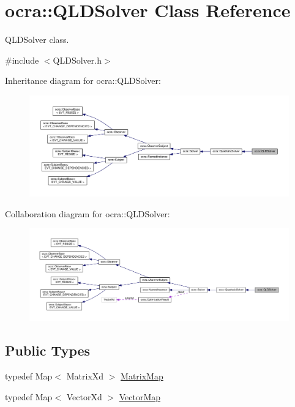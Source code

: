 \hypertarget{classocra_1_1QLDSolver}{}\section{ocra\+:\+:Q\+L\+D\+Solver Class Reference}
\label{classocra_1_1QLDSolver}


Q\+L\+D\+Solver class.  




{\ttfamily \#include $<$Q\+L\+D\+Solver.\+h$>$}



Inheritance diagram for ocra\+:\+:Q\+L\+D\+Solver\+:
\nopagebreak
\begin{figure}[H]
\begin{center}
\leavevmode
\includegraphics[width=350pt]{d8/dea/classocra_1_1QLDSolver__inherit__graph}
\end{center}
\end{figure}


Collaboration diagram for ocra\+:\+:Q\+L\+D\+Solver\+:
\nopagebreak
\begin{figure}[H]
\begin{center}
\leavevmode
\includegraphics[width=350pt]{dd/d5f/classocra_1_1QLDSolver__coll__graph}
\end{center}
\end{figure}
\subsection*{Public Types}
\begin{DoxyCompactItemize}
\item 
typedef Map$<$ Matrix\+Xd $>$ \hyperlink{classocra_1_1QLDSolver_aebfc53b837336b9942a8ed2e6ca6c0e2}{Matrix\+Map}
\item 
typedef Map$<$ Vector\+Xd $>$ \hyperlink{classocra_1_1QLDSolver_a0f7e278b557ca2b7fad6d059ee87a707}{Vector\+Map}
\end{DoxyCompactItemize}
